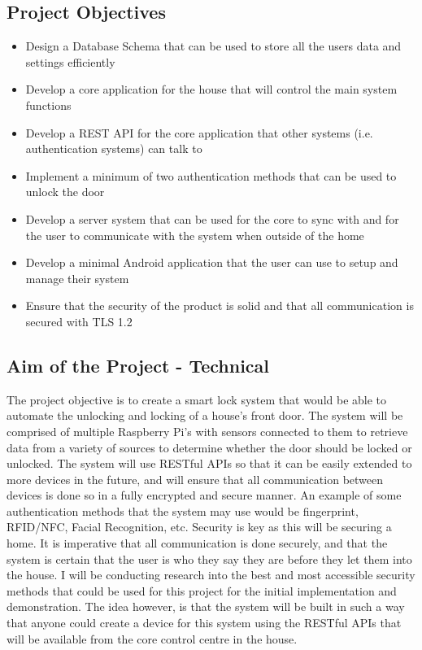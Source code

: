 \subsection{Project Objectives}
\begin{itemize}
	\item Design a Database Schema that can be used to store all the users data and settings efficiently 
	\item Develop a core application for the house that will control the main system functions
	\item Develop a REST API for the core application that other systems (i.e. authentication systems) can talk to
	\item Implement a minimum of two authentication methods that can be used to unlock the door
	\item Develop a server system that can be used for the core to sync with and for the user to communicate with the system when outside of the home
	\item Develop a minimal Android application that the user can use to setup and manage their system
	\item Ensure that the security of the product is solid and that all communication is secured with TLS 1.2
\end{itemize}

\subsection{Aim of the Project - Technical}
The project objective is to create a smart lock system that would be able to automate the unlocking and locking of a house's front door. The system will be comprised of multiple Raspberry Pi's with sensors connected to them to retrieve data from a variety of sources to determine whether the door should be locked or unlocked. The system will use RESTful APIs so that it can be easily extended to more devices in the future, and will ensure that all communication between devices is done so in a fully encrypted and secure manner. An example of some authentication methods that the system may use would be fingerprint, RFID/NFC, Facial Recognition, etc.
\newline
\newline
Security is key as this will be securing a home. It is imperative that all communication is done securely, and that the system is certain that the user is who they say they are before they let them into the house. I will be conducting research into the best and most accessible security methods that could be used for this project for the initial implementation and demonstration. The idea however, is that the system will be built in such a way that anyone could create a device for this system using the RESTful APIs that will be available from the core control centre in the house.

